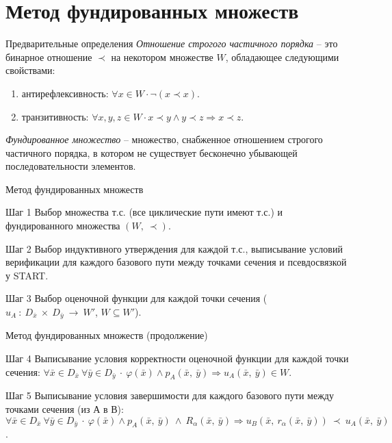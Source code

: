\documentclass[hyperref={unicode=true}]{beamer}
\begin{document}
    \section{Метод фундированных множеств}

    \begin{frame}{Предварительные определения}
	\emph{Отношение строгого частичного порядка} -- это бинарное отношение $\prec$ на некотором множестве $W$, обладающее следующими свойствами:
    \begin{enumerate}
    \item антирефлексивность: $\forall x \in W \cdot \neg (x \prec x)$.
    \item транзитивность: $\forall x, y, z \in W \cdot x \prec y \land y \prec z \Rightarrow x \prec z$.
    \end{enumerate}

    \emph{Фундированное множество} -- множество, снабженное отношением строгого частичного порядка, в котором не существует бесконечно убывающей последовательности элементов.
    \end{frame}

	\begin{frame}{Метод фундированных множеств}

    \begin{block}{Шаг 1}
	Выбор множества т.с. (все циклические пути имеют т.с.) и фундированного множества $(W,~\prec)$.
	\end{block}
	\begin{block}{Шаг 2}
	Выбор индуктивного утверждения для каждой т.с., выписывание условий верификации для каждого
	базового пути между точками сечения и псевдосвязкой у START.
	\end{block}
	\begin{block}{Шаг 3}
	Выбор оценочной функции для каждой точки сечения ($u_A~:~D_{\bar{x}}~\times~D_{\bar{y}}~\rightarrow~W'$, $W \subseteq W'$).
	\end{block}
	\end{frame}

	\begin{frame}{Метод фундированных множеств (продолжение)}

	\begin{block}{Шаг 4}
	Выписывание условия корректности оценочной функции для каждой точки сечения:
	$\forall \bar{x} \in D_{\bar{x}} ~\forall \bar{y} \in D_{\bar{y}} ~\cdot~
	\varphi(\bar{x}) \land p_A(\bar{x},~\bar{y}) \Rightarrow u_A(\bar{x},~\bar{y}) \in W$.
	\end{block}
	\begin{block}{Шаг 5}
	Выписывание условия завершимости для каждого базового пути между точками сечения (из А в В):
	$\forall \bar{x} \in D_{\bar{x}} ~ \forall \bar{y} \in D_{\bar{y}} ~\cdot~
	\varphi(\bar{x}) \land p_A(\bar{x},~\bar{y})~\land~R_\alpha(\bar{x},~\bar{y}) \Rightarrow
	u_B(\bar{x},~r_\alpha(\bar{x},~\bar{y})) ~\prec~ u_A(\bar{x},~\bar{y})$.
	\end{block}
	\end{frame}
\end{document}
